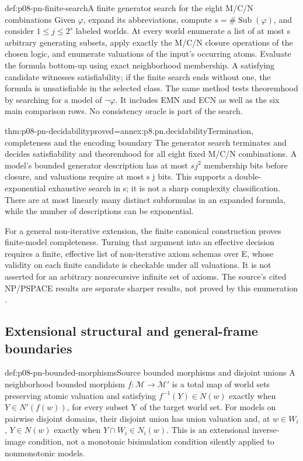 \begin{hbmethod}{def:p08-pn-finite-search}{A finite generator search for the eight M/C/N combinations}
Given \(\varphi\), expand its abbreviations, compute
\(s=\#\operatorname{Sub}(\varphi)\), and consider
\(1\leq j\leq2^s\) labeled worlds. At every world enumerate
a list of at most s arbitrary generating subsets, apply exactly
the M/C/N closure operations of the chosen logic, and enumerate
valuations of the input's occurring atoms. Evaluate the formula
bottom-up using exact neighborhood membership. A satisfying
candidate witnesses satisfiability; if the finite search ends
without one, the formula is unsatisfiable in the selected class.
The same method tests theoremhood by searching for a model of
\(\neg\varphi\). It includes EMN and ECN as well as the six
main comparison rows. No consistency oracle is part of the search.
\end{hbmethod}

\begin{hbtheorem}{thm:p08-pn-decidability}{proved=annex:p8.pn.decidability}{Termination, completeness and the encoding boundary}
The generator search terminates and decides satisfiability and
theoremhood for all eight fixed M/C/N combinations. A model's
bounded generator description has at most \(s j^2\) membership
bits before closure, and valuations require at most s j bits.
This supports a double-exponential exhaustive search in s;
it is not a sharp complexity classification. There are at most
linearly many distinct subformulas in an expanded formula, while
the number of descriptions can be exponential.

For a general non-iterative extension, the finite canonical
construction proves finite-model completeness. Turning that
argument into an effective decision requires a finite,
effective list of non-iterative axiom schemas over E, whose
validity on each finite candidate is checkable under all valuations.
It is not asserted for an
arbitrary nonrecursive infinite set of axioms. The source's
cited NP/PSPACE results are separate sharper results, not
proved by this enumeration \cite[\S\S2.4.1--2.4.2]{Pacuit2017}.
\end{hbtheorem}

\subsection{Extensional structural and general-frame boundaries}

\begin{hbdefinition}{def:p08-pn-bounded-morphisms}{Source bounded morphisms and disjoint unions}
A neighborhood bounded morphism \(f:\mathcal M\to\mathcal M'\)
is a total map of world sets preserving atomic valuation and
satisfying \(f^{-1}(Y)\in N(w)\) exactly when
\(Y\in N'(f(w))\), for every subset Y of the target world set.
For models on pairwise disjoint domains, their disjoint union
has union valuation and, at \(w\in W_i\),
\(Y\in N(w)\) exactly when \(Y\cap W_i\in N_i(w)\).
This is an extensional inverse-image condition, not a monotonic
bisimulation condition silently applied to nonmonotonic models.
\end{hbdefinition}

